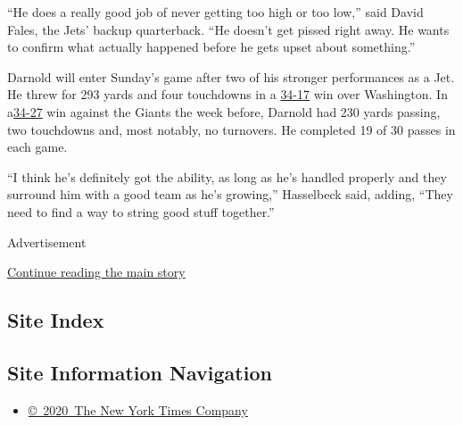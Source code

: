 ``He does a really good job of never getting too high or too low,'' said
David Fales, the Jets' backup quarterback. ``He doesn't get pissed right
away. He wants to confirm what actually happened before he gets upset
about something.''

Darnold will enter Sunday's game after two of his stronger performances
as a Jet. He threw for 293 yards and four touchdowns in a
\href{https://www.nytimes3xbfgragh.onion/2019/11/17/sports/football/jets-redskins-score.html}{34-17}
win over Washington. In
a\href{https://www.nytimes3xbfgragh.onion/2019/11/10/sports/football/giants-jets-score.html}{34-27}
win against the Giants the week before, Darnold had 230 yards passing,
two touchdowns and, most notably, no turnovers. He completed 19 of 30
passes in each game.

``I think he's definitely got the ability, as long as he's handled
properly and they surround him with a good team as he's growing,''
Hasselbeck said, adding, ``They need to find a way to string good stuff
together.''

Advertisement

\protect\hyperlink{after-bottom}{Continue reading the main story}

\hypertarget{site-index}{%
\subsection{Site Index}\label{site-index}}

\hypertarget{site-information-navigation}{%
\subsection{Site Information
Navigation}\label{site-information-navigation}}

\begin{itemize}
\tightlist
\item
  \href{https://help.nytimes3xbfgragh.onion/hc/en-us/articles/115014792127-Copyright-notice}{©~2020~The
  New York Times Company}
\end{itemize}

